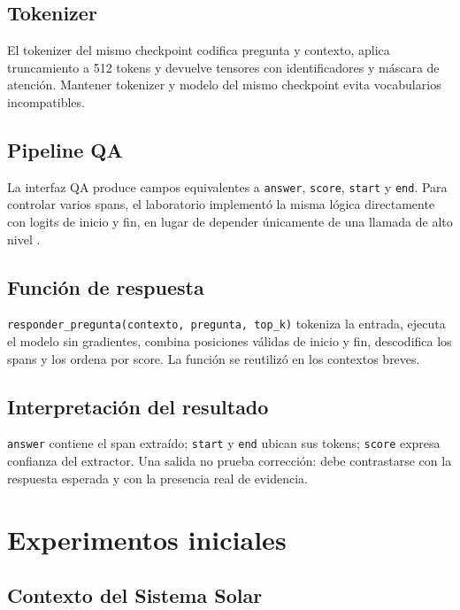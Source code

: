 \documentclass[12pt,letterpaper]{article}
\begin{document}
\subsection{Tokenizer}

El tokenizer del mismo checkpoint codifica pregunta y contexto, aplica
truncamiento a 512 tokens y devuelve tensores con identificadores y máscara de
atención. Mantener tokenizer y modelo del mismo checkpoint evita vocabularios
incompatibles.

\subsection{Pipeline QA}

La interfaz QA produce campos equivalentes a \texttt{answer}, \texttt{score},
\texttt{start} y \texttt{end}. Para controlar varios spans, el laboratorio
implementó la misma lógica directamente con logits de inicio y fin, en lugar
de depender únicamente de una llamada de alto nivel \cite{huggingfaceqa}.

\subsection{Función de respuesta}

\texttt{responder\_pregunta(contexto, pregunta, top\_k)} tokeniza la entrada,
ejecuta el modelo sin gradientes, combina posiciones válidas de inicio y fin,
descodifica los spans y los ordena por score. La función se reutilizó en los
contextos breves.

\subsection{Interpretación del resultado}

\texttt{answer} contiene el span extraído; \texttt{start} y \texttt{end}
ubican sus tokens; \texttt{score} expresa confianza del extractor. Una salida
no prueba corrección: debe contrastarse con la respuesta esperada y con la
presencia real de evidencia.

\section{Experimentos iniciales}

\subsection{Contexto del Sistema Solar}
\end{document}
